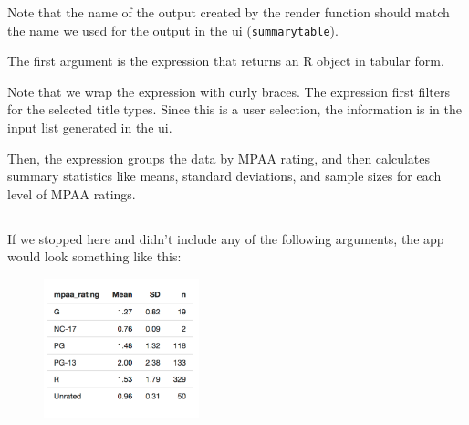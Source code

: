 \documentclass[
  letterpaper,
  DIV=11,
  numbers=noendperiod]{scrreprt}
\newenvironment{Shaded}{\begin{snugshade}}{\end{snugshade}}
\newcommand{\AttributeTok}[1]{\textcolor[rgb]{0.40,0.46,0.14}{#1}}
\newcommand{\FunctionTok}[1]{\textcolor[rgb]{0.28,0.35,0.67}{#1}}
\newcommand{\NormalTok}[1]{\textcolor[rgb]{0.00,0.46,0.62}{#1}}
\newcommand{\SpecialCharTok}[1]{\textcolor[rgb]{0.37,0.37,0.37}{#1}}
\begin{document}
Note that the name of the output created by the render function should
match the name we used for the output in the ui (\texttt{summarytable}).

The first argument is the expression that returns an R object in tabular
form.

\begin{Shaded}
\end{Shaded}

Note that we wrap the expression with curly braces. The expression first
filters for the selected title types. Since this is a user selection,
the information is in the input list generated in the ui.

Then, the expression groups the data by MPAA rating, and then calculates
summary statistics like means, standard deviations, and sample sizes for
each level of MPAA ratings.

\hypertarget{section-40}{%
\subsection{}\label{section-40}}

If we stopped here and didn't include any of the following arguments,
the app would look something like this:

\begin{figure}

{\centering \includegraphics[width=0.4\textwidth,height=\textheight]{./images/summary-table.png}

}

\end{figure}
\end{document}
